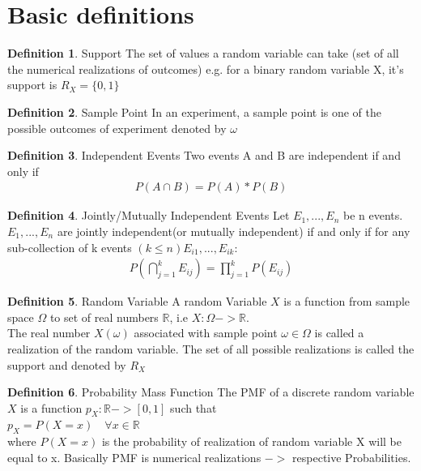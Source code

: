 \documentclass[10pt,a4paper]{article}
\newcommand{\R}{\mathbb{R}}
\begin{document}
\theoremstyle{definition}
\newtheorem{defn}{Definition}[section]


	\section{Basic definitions}

	\begin{defn}{Support}
		The set of values a random variable can take (set of all the numerical realizations of outcomes) e.g. for a binary random variable X, it's support is $R_X = \{ 0, 1 \}$
	\end{defn}


	\begin{defn}{Sample Point}
		In an experiment, a sample point is one of the possible outcomes of experiment denoted by $\omega$
	\end{defn}

	\begin{defn}{Independent Events}
	Two events A and B are independent if and only if \\
	\begin{align}
		P(A \cap B) = P(A) * P(B)
	\end{align}
	\end{defn}

	\begin{defn}{Jointly/Mutually Independent Events}
	Let $E_1, ... , E_n$ be n events. \\
	$E_1, ... , E_n$ are jointly independent(or mutually independent)
	if and only if for any sub-collection of k events $(k \leq n) E_{i1}, ... , E_{ik}$:
	\begin{align}
	P(\bigcap \limits_{j=1}^kE_{ij}) = \prod_{j=1}^{k}P(E_{ij})
	\end{align}
	\end{defn}

	\begin{defn}{Random Variable}
		A random Variable $X$ is a function from sample space $\Omega$ to set of real numbers $\R$, i.e $ X: \Omega -> \R $.\\
		
		The real number $X(\omega)$ associated with sample point $\omega \in \Omega$ is called a realization of the random variable. The set of all possible realizations is called the support and denoted by $R_X$
	\end{defn}

	\begin{defn}{Probability Mass Function}
		The PMF of a discrete random variable $X$ is a function $p_X : \R -> [0,1]$ such that\\
		$p_X = P(X = x)\quad \forall x \in \R$\\
		where $P(X = x)$ is the probability of realization of random variable X will be equal to x. Basically PMF is numerical realizations $->$ respective Probabilities.
	\end{defn}
\end{document}
